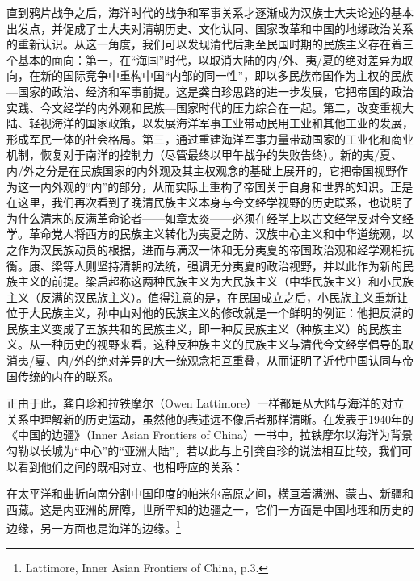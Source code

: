 \documentclass[a4paper, 12pt, openright]{ctexbook}
\renewenvironment{quote}
  {\list{}{\rightmargin2\ccwd \leftmargin2\ccwd \itemindent=2\ccwd \listparindent=2\ccwd}%
   \item\relax\small\kaishu\color{black}}
  {\endlist}
\begin{document}
直到鸦片战争之后，海洋时代的战争和军事关系才逐渐成为汉族士大夫论述的基本出发点，并促成了士大夫对清朝历史、文化认同、国家改革和中国的地缘政治关系的重新认识。从这一角度，我们可以发现清代后期至民国时期的民族主义存在着三个基本的面向：第一，在“海国”时代，以取消大陆的内/外、夷/夏的绝对差异为取向，在新的国际竞争中重构中国“内部的同一性”，即以多民族帝国作为主权的民族—国家的政治、经济和军事前提。这是龚自珍思路的进一步发展，它把帝国的政治实践、今文经学的内外观和民族—国家时代的压力综合在一起。第二，改变重视大陆、轻视海洋的国家政策，以发展海洋军事工业带动民用工业和其他工业的发展，形成军民一体的社会格局。第三，通过重建海洋军事力量带动国家的工业化和商业机制，恢复对于南洋的控制力（尽管最终以甲午战争的失败告终）。新的夷/夏、内/外之分是在民族国家的内外观及其主权观念的基础上展开的，它把帝国视野作为这一内外观的“内”的部分，从而实际上重构了帝国关于自身和世界的知识。正是在这里，我们再次看到了晚清民族主义本身与今文经学视野的历史联系，也说明了为什么清末的反满革命论者——如章太炎——必须在经学上以古文经学反对今文经学。革命党人将西方的民族主义转化为夷夏之防、汉族中心主义和中华道统观，以之作为汉民族动员的根据，进而与满汉一体和无分夷夏的帝国政治观和经学观相抗衡。康、梁等人则坚持清朝的法统，强调无分夷夏的政治视野，并以此作为新的民族主义的前提。梁启超称这两种民族主义为大民族主义（中华民族主义）和小民族主义（反满的汉民族主义）。值得注意的是，在民国成立之后，小民族主义重新让位于大民族主义，孙中山对他的民族主义的修改就是一个鲜明的例证：他把反满的民族主义变成了五族共和的民族主义，即一种反民族主义（种族主义）的民族主义。从一种历史的视野来看，这种反种族主义的民族主义与清代今文经学倡导的取消夷/夏、内/外的绝对差异的大一统观念相互重叠，从而证明了近代中国认同与帝国传统的内在的联系。

正由于此，龚自珍和拉铁摩尔（Owen Lattimore）一样都是从大陆与海洋的对立关系中理解新的历史运动，虽然他的表述远不像后者那样清晰。在发表于1940年的《中国的边疆》（Inner Asian Frontiers of China）一书中，拉铁摩尔以海洋为背景勾勒以长城为“中心”的“亚洲大陆”，若以此与上引龚自珍的说法相互比较，我们可以看到他们之间的既相对立、也相呼应的关系：

\begin{quote}
在太平洋和曲折向南分割中国印度的帕米尔高原之间，横亘着满洲、蒙古、新疆和西藏。这是内亚洲的屏障，世所罕知的边疆之一，它们一方面是中国地理和历史的边缘，另一方面也是海洋的边缘。\footnote{Lattimore, Inner Asian Frontiers of China, p.3.}
\end{quote}
\end{document}
